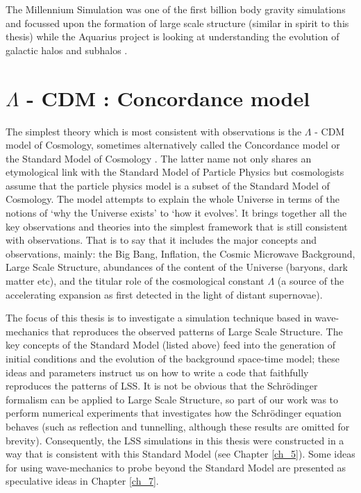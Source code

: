 The Millennium Simulation was one of the first billion body gravity simulations and focussed upon the formation of large scale structure (similar in spirit to this thesis) while the Aquarius project is looking at understanding the evolution of galactic halos and subhalos \citep{bib_aqu2}.


\section{$\Lambda$ - CDM : Concordance model}
The simplest theory which is most consistent with observations is the $\Lambda$ - CDM model of Cosmology, sometimes alternatively called the Concordance model or the Standard Model of Cosmology \citep{bib_lah}. The latter name not only shares an etymological link with the Standard Model of Particle Physics but cosmologists assume that the particle physics model is a subset of the Standard Model of Cosmology. The model attempts to explain the whole Universe in terms of the notions of `why the Universe exists' to `how it evolves'. It brings together all the key observations and theories into the simplest framework that is still consistent with observations. That is to say that it includes the major concepts and observations, mainly: the Big Bang, Inflation, the Cosmic Microwave Background, Large Scale Structure, abundances of the content of the Universe (baryons, dark matter etc), and the titular role of the cosmological constant $\Lambda$ (a source of the accelerating expansion as first detected in the light of distant supernovae).

The focus of this thesis is to investigate a simulation technique based in wave-mechanics that reproduces the observed patterns of Large Scale Structure. The key concepts of the Standard Model (listed above) feed into the generation of initial conditions and the evolution of the background space-time model; these ideas and parameters instruct us on how to write a code that faithfully reproduces the patterns of LSS.  It is not be obvious that the Schr\"odinger formalism can be applied to Large Scale Structure, so part of our work was to perform numerical experiments that investigates how the Schr\"odinger equation behaves (such as reflection and tunnelling, although these results are omitted for brevity). Consequently, the LSS simulations in this thesis were constructed in a way that is consistent with this Standard Model (see Chapter \ref{ch_5}). Some ideas for using wave-mechanics to probe beyond the Standard Model are presented as speculative ideas in Chapter \ref{ch_7}.

